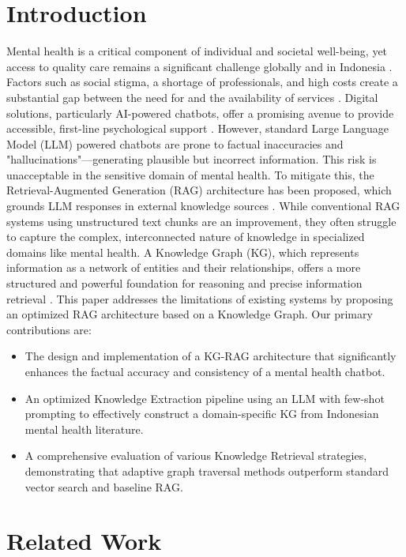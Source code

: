 \documentclass[conference]{IEEEtran}
\begin{document}
\section{Introduction}
Mental health is a critical component of individual and societal well-being, yet access to quality care remains a significant challenge globally and in Indonesia \cite{INAMHS2022}.
Factors such as social stigma, a shortage of professionals, and high costs create a substantial gap between the need for and the availability of services \cite{WHO2022MentalHealth}.
Digital solutions, particularly AI-powered chatbots, offer a promising avenue to provide accessible, first-line psychological support \cite{CBTWoebotTest}.
However, standard Large Language Model (LLM) powered chatbots are prone to factual inaccuracies and "hallucinations"—generating plausible but incorrect information.
This risk is unacceptable in the sensitive domain of mental health. To mitigate this, the Retrieval-Augmented Generation (RAG) architecture has been proposed, which grounds LLM responses in external knowledge sources \cite{Lewis2021RAGKnowledgeIntensiveNLP}.
While conventional RAG systems using unstructured text chunks are an improvement, they often struggle to capture the complex, interconnected nature of knowledge in specialized domains like mental health.
A Knowledge Graph (KG), which represents information as a network of entities and their relationships, offers a more structured and powerful foundation for reasoning and precise information retrieval \cite{Edge2025LocalGlobalGraphRAG}.
This paper addresses the limitations of existing systems by proposing an optimized RAG architecture based on a Knowledge Graph. Our primary contributions are:
\begin{itemize}
    \item The design and implementation of a KG-RAG architecture that significantly enhances the factual accuracy and consistency of a mental health chatbot.
    \item An optimized Knowledge Extraction pipeline using an LLM with few-shot prompting to effectively construct a domain-specific KG from Indonesian mental health literature.
    \item A comprehensive evaluation of various Knowledge Retrieval strategies, demonstrating that adaptive graph traversal methods outperform standard vector search and baseline RAG.
\end{itemize}

\section{Related Work}
\end{document}

